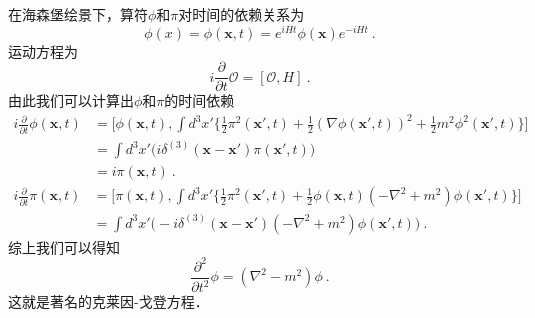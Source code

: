 
在海森堡绘景下，算符$\phi$和$\pi$对时间的依赖关系为
\begin{equation}
\phi(x) = \phi(\mathbf x, t) = e^{i H t}\phi(\mathbf x)e^{-iHt}~.
\end{equation}
运动方程为 
\begin{equation}
i \frac{\partial}{\partial t}\mathcal O = [\mathcal O, H]~.
\end{equation}
由此我们可以计算出$\phi$和$\pi$的时间依赖
\begin{equation}
\begin{aligned}
i \frac{\partial}{\partial t} \phi(\mathbf x,t) & = \bigg[\phi(\mathbf x,t),\int d^3 x' \bigg\{ \frac{1}{2} \pi^2 (\mathbf x',t) + \frac{1}{2} (\nabla \phi(\mathbf x',t))^2 + \frac{1}{2} m^2 \phi^2(\mathbf x',t) \bigg\}\bigg] \\
& = \int d^3 x' \bigg(i \delta^{(3)} (\mathbf x - \mathbf x') \pi(\mathbf x',t) \bigg) \\
& = i \pi (\mathbf x, t)~.
\end{aligned}
\end{equation}
\begin{equation}
\begin{aligned}
i\frac{\partial}{\partial t} \pi(\mathbf x, t) & = \bigg[ \pi(\mathbf x,t), \int d^3 x' \bigg\{  \frac{1}{2} \pi^2 (\mathbf x', t) + \frac{1}{2} \phi(\mathbf x, t) (-\nabla^2 + m^2 ) \phi(\mathbf x', t) \bigg\} \bigg] \\
& = \int d^3 x' \bigg( - i \delta^{(3)} (\mathbf x - \mathbf x') (-\nabla^2+m^2) \phi(\mathbf x',t) \bigg)~.
\end{aligned}
\end{equation}
综上我们可以得知
\begin{equation}
\frac{\partial^2}{\partial t^2} \phi = (\nabla^2 - m^2)\phi~.
\end{equation}
这就是著名的克莱因-戈登方程．

